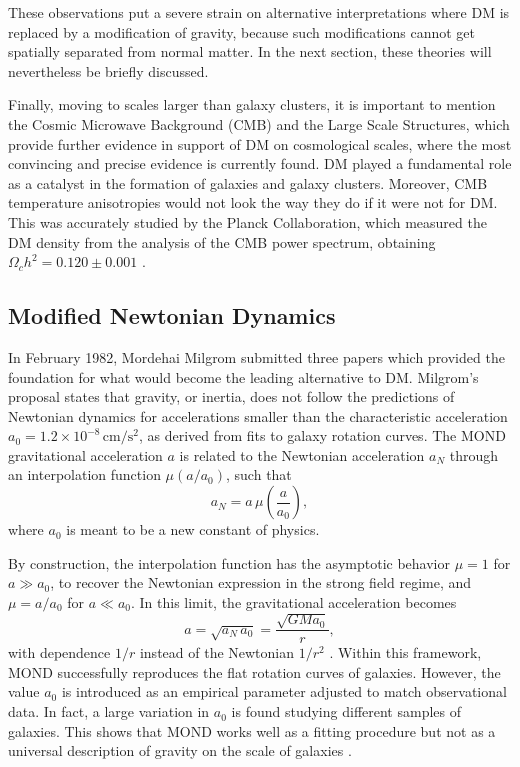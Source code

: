 These observations put a severe strain on alternative interpretations where DM is replaced by a modification of gravity, because such modifications cannot get spatially separated from normal matter. In the next section, these theories will nevertheless be briefly discussed.

\medskip 

Finally, moving to scales larger than galaxy clusters, it is important to mention the Cosmic Microwave Background (CMB) and the Large Scale Structures, which provide further evidence in support of DM on cosmological scales, where the most convincing and precise evidence is currently found.
DM played a fundamental role as a catalyst in the formation of galaxies and galaxy clusters. Moreover, CMB temperature anisotropies would not look the way they do if it were not for DM. This was accurately studied by the Planck Collaboration, which measured the DM density from the analysis of the CMB power spectrum, obtaining $\Omega_c h^2 = 0.120 \pm 0.001$ \cite{Planck2018}.



\subsection{Modified Newtonian Dynamics}

In February 1982, Mordehai Milgrom submitted three papers \cite{Milgrom1983a,Milgrom1983b,Milgrom1983c} which provided the
foundation for what would become the leading alternative to DM. 
Milgrom's proposal states that gravity, or inertia, does
not follow the predictions of Newtonian dynamics for accelerations smaller than the characteristic acceleration $a_0 = 1.2 \times 10^{-8}\,\mathrm{cm/s^2}$, as derived from fits to galaxy rotation curves.
The MOND gravitational acceleration $a$ is related to the Newtonian acceleration $a_N$ through an interpolation function $\mu(a/a_0)$, such that
\begin{equation}
    a_N = a\,\mu\left(\frac{a}{a_0}\right),
\end{equation}
where $a_0$ is meant to be a new constant of physics.

By construction, the interpolation function has the asymptotic behavior
$\mu = 1$ for $a \gg a_0$, to recover the Newtonian expression in the strong field regime, and $\mu = a/a_0$ for $a \ll a_0$.
In this limit, the gravitational acceleration becomes
\begin{equation}
    a = \sqrt{a_N\,a_0} = \frac{\sqrt{GM a_0}}{r},
\end{equation}
with dependence $1/r$ instead of the Newtonian $1/r^2$ \cite{Scarpa_2006}.
Within this framework, MOND successfully reproduces the flat rotation curves of galaxies. However, the value $a_0$ is introduced as an empirical parameter adjusted to match observational data. In fact, a large variation in $a_0$ is found studying different samples of galaxies. 
This shows that MOND works well as a fitting procedure but not as a universal
description of gravity on the scale of galaxies \cite{a0}.

